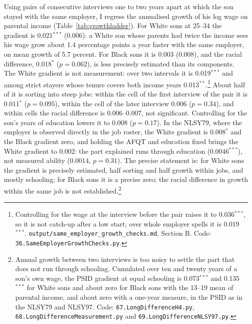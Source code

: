 Using pairs of consecutive interviews one to two years apart at which the son stayed with the same employer, I regress
the annualised growth of his log wage on parental income (Table~\ref{tab:growthladder}). For White sons at 25--34 the
gradient is 0.021$^{***}$ (0.006): a White son whose parents had twice the income sees his wage grow about 1.4 percentage
points a year faster with the same employer, on mean growth of 5.7 percent. For Black sons it is 0.003 (0.008), and the
racial difference, 0.018$^{*}$ ($p=0.062$), is less precisely estimated than its components. The White gradient is not
measurement: over two intervals it is 0.019$^{***}$ and among strict stayers whose tenure covers both income years
0.013$^{**}$.\footnote{Controlling for the wage at the interview before the pair raises it to 0.036$^{***}$, so it is not
catch-up after a low start; over whole employer spells it is 0.019$^{***}$. \texttt{output/same\_employer\_growth\_checks.md},
Section B. Code: \texttt{36.SameEmployerGrowthChecks.py}.} About half of it is sorting into steep jobs: within the
cell of the first interview of the pair it is 0.011$^{*}$ ($p=0.095$), within the cell of the later interview 0.006
($p=0.34$), and within cells the racial difference is 0.006--0.007, not significant. Controlling for the son's years of
education lowers it to 0.008 ($p=0.17$). In the NLSY79, where the employer is observed directly in the job roster, the
White gradient is 0.008$^{*}$ and the Black gradient zero, and holding the AFQT and education fixed brings the White
gradient to 0.002: the part explained runs through education (0.0046$^{***}$), not measured ability (0.0014, $p=0.31$).
The precise statement is: for White sons the gradient is precisely estimated, half sorting and half growth within jobs,
and mostly schooling; for Black sons it is a precise zero; the racial difference in growth within the same job is not
established.\footnote{Annual growth between two interviews is too noisy to settle the part that does not run through
schooling. Cumulated over ten and twenty years of a son's own wage, the PSID gradient at equal schooling is
0.073$^{***}$ and 0.135$^{***}$ for White sons and about zero for Black sons with the 13--19 mean of parental income,
and about zero with a one-year measure, in the PSID as in the NLSY79 and NLSY97. Code:
\texttt{67.LongDifferenceH4.py}, \texttt{68.LongDifferenceMeasurement.py} and \texttt{69.LongDifferenceNLSY97.py}.}





